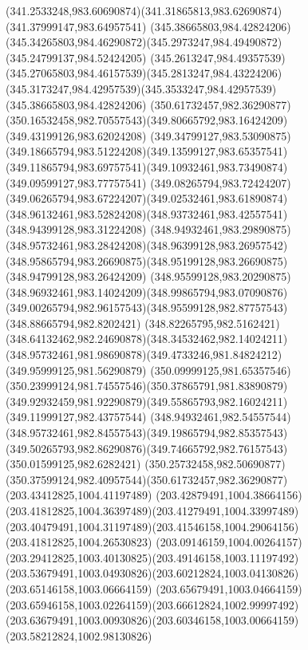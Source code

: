 {    \curveto(341.2533248,983.60690874)(341.31865813,983.62690874)(341.37999147,983.64957541)
    \moveto(345.38665803,984.42824206)
    \curveto(345.34265803,984.46290872)(345.2973247,984.49490872)(345.24799137,984.52424205)
    \curveto(345.2613247,984.49357539)(345.27065803,984.46157539)(345.2813247,984.43224206)
    \curveto(345.3173247,984.42957539)(345.3533247,984.42957539)(345.38665803,984.42824206)
    \moveto(350.61732457,982.36290877)
    \curveto(350.16532458,982.70557543)(349.80665792,983.16424209)(349.43199126,983.62024208)
    \curveto(349.34799127,983.53090875)(349.18665794,983.51224208)(349.13599127,983.65357541)
    \curveto(349.11865794,983.69757541)(349.10932461,983.73490874)(349.09599127,983.77757541)
    \curveto(349.08265794,983.72424207)(349.06265794,983.67224207)(349.02532461,983.61890874)
    \curveto(348.96132461,983.52824208)(348.93732461,983.42557541)(348.94399128,983.31224208)
    \curveto(348.94932461,983.29890875)(348.95732461,983.28424208)(348.96399128,983.26957542)
    \curveto(348.95865794,983.26690875)(348.95199128,983.26690875)(348.94799128,983.26424209)
    \curveto(348.95599128,983.20290875)(348.96932461,983.14024209)(348.99865794,983.07090876)
    \curveto(349.00265794,982.96157543)(348.95599128,982.87757543)(348.88665794,982.8202421)
    \curveto(348.82265795,982.5162421)(348.64132462,982.24690878)(348.34532462,982.14024211)
    \curveto(348.95732461,981.98690878)(349.4733246,981.84824212)(349.95999125,981.56290879)
    \curveto(350.09999125,981.65357546)(350.23999124,981.74557546)(350.37865791,981.83890879)
    \curveto(349.92932459,981.92290879)(349.55865793,982.16024211)(349.11999127,982.43757544)
    \curveto(348.94932461,982.54557544)(348.95732461,982.84557543)(349.19865794,982.85357543)
    \curveto(349.50265793,982.86290876)(349.74665792,982.76157543)(350.01599125,982.6282421)
    \curveto(350.25732458,982.50690877)(350.37599124,982.40957544)(350.61732457,982.36290877)
    \closepath
    \moveto(203.43412825,1004.41197489)
    \curveto(203.42879491,1004.38664156)(203.41812825,1004.36397489)(203.41279491,1004.33997489)
    \curveto(203.40479491,1004.31197489)(203.41546158,1004.29064156)(203.41812825,1004.26530823)
    \curveto(203.09146159,1004.00264157)(203.29412825,1003.40130825)(203.49146158,1003.11197492)
    \curveto(203.53679491,1003.04930826)(203.60212824,1003.04130826)(203.65146158,1003.06664159)
    \curveto(203.65679491,1003.04664159)(203.65946158,1003.02264159)(203.66612824,1002.99997492)
    \curveto(203.63679491,1003.00930826)(203.60346158,1003.00664159)(203.58212824,1002.98130826)
}
